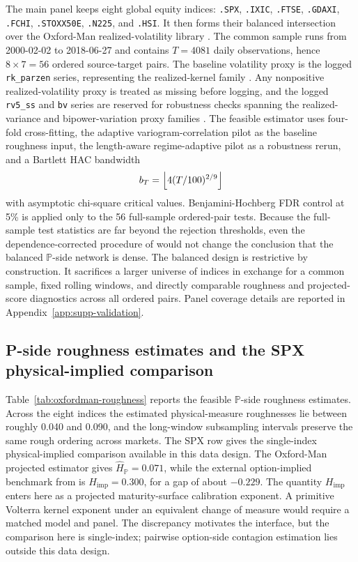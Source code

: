 \documentclass[11pt,a4paper]{amsart}
\theoremstyle{plain}
\theoremstyle{definition}
\theoremstyle{remark}
\newcommand{\PP}{\mathbb{P}}
\begin{document}
The main panel keeps eight global equity indices: \texttt{.SPX}, \texttt{.IXIC},
\texttt{.FTSE}, \texttt{.GDAXI}, \texttt{.FCHI}, \texttt{.STOXX50E}, \texttt{.N225}, and
\texttt{.HSI}.  It then forms their balanced intersection over the Oxford-Man realized-volatility
library \cite{oxfordman2009library}.  The common
sample runs from 2000-02-02 to 2018-06-27 and contains \(T=4081\) daily observations, hence
\(8\times7=56\) ordered source-target pairs.  The baseline volatility proxy is the logged
\texttt{rk\_parzen} series, representing the realized-kernel family
\cite{bnhls2008realizedkernels}.  Any nonpositive realized-volatility proxy is treated as missing
before logging, and the logged \texttt{rv5\_ss} and \texttt{bv} series are reserved for robustness
checks spanning the realized-variance and bipower-variation proxy families
\cite{barndorff2002realized,bns2004bipower}.
The feasible estimator uses four-fold cross-fitting, the adaptive variogram-correlation pilot as the
baseline roughness input, the length-aware regime-adaptive pilot as a robustness rerun, and a
Bartlett HAC bandwidth
\[
        b_T
        =
        \Bigl\lfloor 4(T/100)^{2/9}\Bigr\rfloor
\]
with asymptotic chi-square critical values.  Benjamini-Hochberg FDR control at 5\%
\cite{benjamini1995fdr} is applied only to the 56 full-sample ordered-pair tests.  Because the full-sample test statistics are far beyond the rejection thresholds, even the
dependence-corrected procedure of \cite{benjamini2001fdr} would not change the conclusion that the
balanced \(\PP\)-side network is dense.  The balanced design is restrictive by construction.  It
sacrifices a larger universe of indices in exchange for a common sample, fixed rolling windows, and
directly comparable roughness and projected-score diagnostics across all ordered pairs.  Panel
coverage details are reported in Appendix~\ref{app:supp-validation}.

\subsection{P-side roughness estimates and the SPX physical-implied comparison}

Table~\ref{tab:oxfordman-roughness} reports the feasible \(\PP\)-side roughness estimates.  Across
the eight indices the estimated physical-measure roughnesses lie between roughly 0.040 and 0.090,
and the long-window subsampling intervals preserve the same rough ordering across markets.  The SPX
row gives the single-index physical-implied comparison available in this data design.  The
Oxford-Man projected estimator gives \(\widehat H_{\PP}=0.071\), while the external option-implied
benchmark from \cite{livieri2018rough} is \(H_{\mathrm{imp}}=0.300\), for a gap of about \(-0.229\).
The quantity \(H_{\mathrm{imp}}\) enters here as a projected maturity-surface calibration exponent.
A primitive Volterra kernel exponent under an equivalent change of measure would require a matched
model and panel.  The discrepancy motivates the interface, but the comparison here is single-index; pairwise
option-side contagion estimation lies outside this data design.
\end{document}
